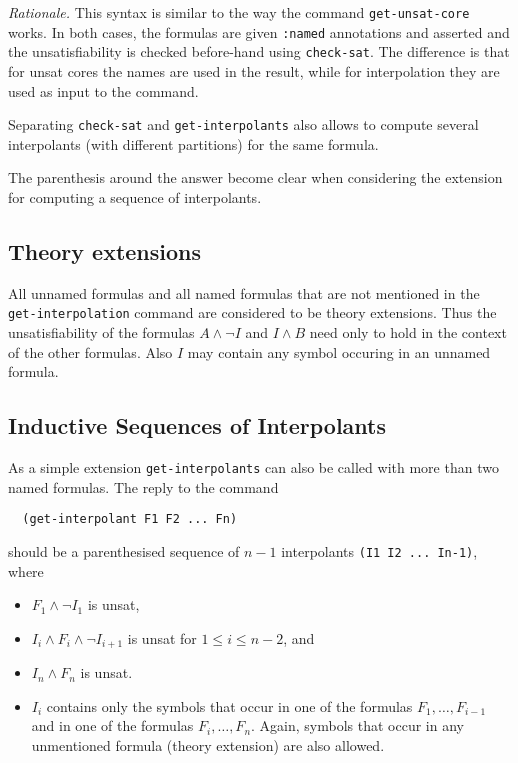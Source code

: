 \documentclass[a4paper,12pt]{article}
\begin{document}
\emph{Rationale.} This syntax is similar to the way the command
\texttt{get-unsat-core} works.  In both cases, the formulas are given
\texttt{:named} annotations and asserted and the unsatisfiability is
checked before-hand using \texttt{check-sat}.  The difference is that
for unsat cores the names are used in the result, while for
interpolation they are used as input to the command.

Separating \texttt{check-sat} and \texttt{get-interpolants} also
allows to compute several interpolants (with different partitions) for
the same formula.

The parenthesis around the answer become clear when considering the
extension for computing a sequence of interpolants.

\subsection{Theory extensions}
All unnamed formulas and all named formulas that are not mentioned in
the \texttt{get-interpolation} command are considered to be theory
extensions.  Thus the unsatisfiability of the formulas $A\land \lnot
I$ and $I\land B$ need only to hold in the context of the other
formulas.  Also $I$ may contain any symbol occuring in an unnamed
formula.

\subsection{Inductive Sequences of Interpolants}
As a simple extension \texttt{get-interpolants} can also be called
with more than two named formulas.  The reply to the command
\begin{verbatim}
  (get-interpolant F1 F2 ... Fn)
\end{verbatim}
should be a parenthesised sequence of $n-1$ interpolants 
\verb+(I1 I2 ... In-1)+, where
\begin{itemize}
\item $F_1\land \lnot I_1$ is unsat,
\item $I_i\land F_i \land \lnot I_{i+1}$ is unsat for $1\leq i \leq n-2$, and
\item $I_n\land F_n$ is unsat.
\item $I_i$ contains only the symbols that occur in one of the
  formulas $F_1,\dots,F_{i-1}$ and in one of the formulas
  $F_i,\dots,F_n$.  Again, symbols that occur in any unmentioned
  formula (theory extension) are also allowed.
\end{itemize}
\end{document}
